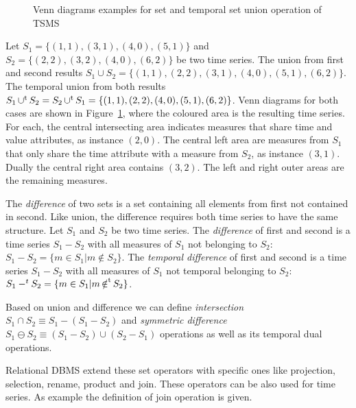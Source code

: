\begin{figure}
  \centering
  
  \caption{Venn diagrams examples for set and temporal set union
    operation of TSMS}
  \label{fig:model:venn}
\end{figure}


\begin{example}\label{ex:model:s1s2}
  Let $S_1=\{(1,1),(3,1),(4,0),(5,1)\}$ and $S_2 =\allowbreak \{\allowbreak
  (2,2),\allowbreak (3,2),(4,0),(6,2)\}$ be two time series. The union
  from first and second results $S_1 \cup S_2 =
  \{(1,1),(2,2),\allowbreak (3,1),\allowbreak (4,0),\allowbreak
  (5,1),(6,2)\}$. The temporal union from both results $S_1 \operatorname*{\cup^t} S_2
  = S_2 \operatorname*{\cup^t} S_1 = \{(1,1),(2,2),(4,0),(5,1),\allowbreak (6,2)\}$. %
  \linebreak[4] Venn diagrams for both cases are shown in
  Figure~\ref{fig:model:venn}, where the coloured area is the
  resulting time series. For each, the central intersecting area
  indicates measures that share time and value attributes, as instance
  $(2,0)$. The central left area are measures from $S_1$ that only
  share the time attribute with a measure from $S_2$, as instance
  $(3,1)$. Dually the central right area contains $(3,2)$. The left
  and right outer areas are the remaining measures.
 \end{example}




The \emph{difference} of two sets is a set containing all elements
from first not contained in second. Like union, the difference
requires both time series to have the same structure. %
Let $S_1$ and $S_2$ be two time series. The \emph{difference} of first
and second is a time series $S_1 - S_2$ with all measures of $S_1$ not
belonging to $S_2$: $S_1 - S_2 = \{ m \in S_1 | m \notin S_2
\}$. The \emph{temporal difference} of first and second is a time
series $S_1 - S_2$ with all measures of $S_1$ not temporal belonging
to $S_2$: $S_1 -^t S_2 = \{ m \in S_1 | m \operatorname*{\notin^t} S_2 \}$.


Based on union and difference we can define \emph{intersection} $S_1\cap
S_2 \equiv S_1 - (S_1 - S_2)$ and \emph{symmetric difference} $S_1 \ominus
S_2 \equiv (S_1 - S_2) \cup (S_2 - S_1)$ operations as well as its
temporal dual operations.


Relational DBMS extend these set operators with specific ones like
projection, selection, rename, product and join. These operators can
be also used for time series. As example the definition of join
operation is given.


